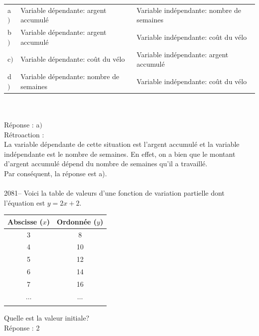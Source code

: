 \documentclass[letterpaper, 12pt]{article}
\begin{document}
\begin{tabular}{l l l}
a$)$ & Variable d\'ependante: argent accumul\'e & Variable ind\'ependante: nombre de semaines\\
b$)$ & Variable d\'ependante: argent accumul\'e & Variable ind\'ependante: co\^ut du v\'elo\\
c$)$ & Variable d\'ependante: co\^ut du v\'elo & Variable ind\'ependante: argent accumul\'e\\
d$)$ & Variable d\'ependante: nombre de semaines & Variable ind\'ependante: co\^ut du v\'elo\\
\end{tabular}\\[2mm]
\\
R\'eponse : a$)$ \\

R\'etroaction :\\
La variable d\'ependante de cette situation est l'argent accumul\'e et la variable ind\'ependante est le nombre de semaines. En effet, on a bien que le montant d'argent accumul\'e d\'epend du nombre de semaines qu'il a travaill\'e.\\
Par cons\'equent, la r\'eponse est a).\\ \\

2081-- Voici la table de valeurs d'une fonction de variation partielle dont l'\'equation est $y = 2x + 2$.
\begin{center}
 \begin{tabular}{|c|c|} \hline
{\bf Abscisse ($x$)} & {\bf Ordonn\'ee ($y$)}  \\ \hline \hline
3 & 8 \\ \hline
4 & 10 \\ \hline
5 & 12 \\ \hline
6 & 14 \\ \hline
7 & 16 \\ \hline
$\ldots$ & $\ldots$ \\ \hline
\multicolumn{2}{c}{}\\
\end{tabular}
\end{center}
Quelle est la valeur initiale?\\

R\'eponse : 2\\
\end{document}
